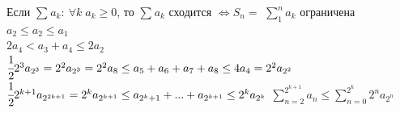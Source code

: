 \documentclass[12pt, paper]{article}
\begin{document}
\begin{tcolorbox}
    Если $ \sum^{}_{} a_k:\ \forall k\; a_k \geq 0$, то $ \sum^{}_{} a_k$ сходится $\Leftrightarrow S_n=$ $ \sum^{n}_{1} a_k$ ограничена\\
    $ a_2 \leq a_2 \leq a_1 $\\
    $2a_4 < a_3 + a_4 \leq 2a_2 $\\
    $\cfrac{1}{2} 2^3 a_{2^3} = 2^2a_{2^3} = 2^2a_8 \leq a_5+a_6+a_7+a_8 \leq 4a_4 = 2^2 a_{2^2}$\\
    $\cfrac{1}{2}2^{k+1} a_{2^{2k+1}} = 2^ka_{2^{k+1}} \leq a_{2^k+1} + ... + a_{2^{k+1}} \leq 2^ka_{2^k}$
    $\sum^{2^{k+1}}_{n=2} a_n \leq \sum^{2^{k}}_{n=0} 2^n a_{2^n}$
\end{tcolorbox}
\end{document}
